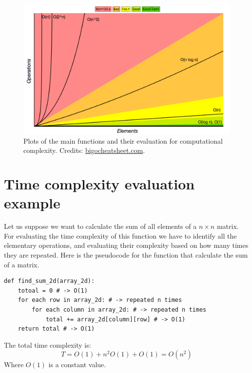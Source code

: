 \begin{figure}[hb]
	\begin{center}
		\includegraphics[scale=0.3]{chapters/introduction/images/big_o_plots.png}
		\caption[Plots of the main functions and their evaluation for computational complexity.]{Plots of the main functions and their evaluation for computational complexity. Credits: \href{https://www.bigocheatsheet.com/}{bigocheatsheet.com}.}
		\label{fig:bigoplots}
	\end{center}
\end{figure}

\section{Time complexity evaluation example}
Let us suppose we want to calculate the sum of all elements of a \(n\times n\) matrix. For evaluating the time complexity of this function we have to identify all the elementary operations, and evaluating their complexity based on how many times they are repeated. Here is the pseudocode for the function that calculate the sum of a matrix.

\begin{lstlisting}[firstnumber=1, caption={Sum of all elements of a matrix.}]
def find_sum_2d(array_2d):
	totoal = 0 # -> O(1)
	for each row in array_2d: # -> repeated n times
		for each column in array_2d: # -> repeated n times
			total += array_2d[column][row] # -> O(1)
	return total # -> O(1)
\end{lstlisting}

The total time complexity is: 
\[T = O(1) + n^{2}O(1) + O(1) = O(n^{2}) \]
Where \(O(1)\) is a constant value.

